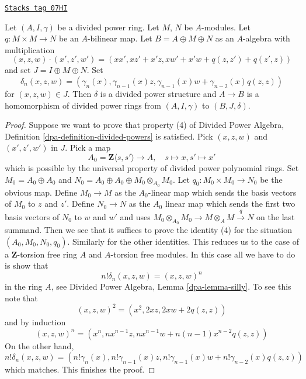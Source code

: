 \begin{lemma}
\label{crystalline-lemma-divided-power-second-order-thickening}
\href{https://stacks.math.columbia.edu/tag/07HI}{\texttt{Stacks tag 07HI}}

Let $(A, I, \gamma)$ be a divided power ring. Let $M$, $N$ be $A$-modules.
Let $q : M \times M \to N$ be an $A$-bilinear map.
Let $B = A \oplus M \oplus N$ as an $A$-algebra with multiplication
$$
(x, z, w)\cdot (x', z', w') = (xx', xz' + x'z, xw' + x'w + q(z, z') + q(z', z))
$$
and set $J = I \oplus M \oplus N$. Set
$$
\delta_n(x, z, w) = (\gamma_n(x), \gamma_{n - 1}(x)z,
\gamma_{n - 1}(x)w + \gamma_{n - 2}(x)q(z, z))
$$
for $(x, z, w) \in J$.
Then $\delta$ is a divided power structure and
$A \to B$ is a homomorphism of divided power rings from
$(A, I, \gamma)$ to $(B, J, \delta)$.
\end{lemma}

\begin{proof}
Suppose we want to prove that property (4) of
Divided Power Algebra, Definition \ref{dpa-definition-divided-powers}
is satisfied. Pick $(x, z, w)$ and $(x', z', w')$ in $J$.
Pick a map
$$
A_0 = \mathbf{Z}\langle s, s'\rangle \longrightarrow A,\quad
s \longmapsto x,
s' \longmapsto x'
$$
which is possible by the universal property of divided power
polynomial rings. Set $M_0 = A_0 \oplus A_0$ and
$N_0 = A_0 \oplus A_0 \oplus M_0 \otimes_{A_0} M_0$.
Let $q_0 : M_0 \times M_0 \to N_0$ be the obvious map.
Define $M_0 \to M$ as the $A_0$-linear map which sends
the basis vectors of $M_0$ to $z$ and $z'$. Define $N_0 \to N$
as the $A_0$ linear map which sends the first two basis vectors
of $N_0$ to $w$ and $w'$ and uses
$M_0 \otimes_{A_0} M_0 \to M \otimes_A M \xrightarrow{q} N$
on the last summand. Then we see that it suffices to prove the
identity (4) for the situation $(A_0, M_0, N_0, q_0)$.
Similarly for the other identities. This reduces us to the case
of a $\mathbf{Z}$-torsion free ring $A$ and $A$-torsion free modules.
In this case all we have to do is show that
$$
n! \delta_n(x, z, w) = (x, z, w)^n
$$
in the ring $A$, see Divided Power Algebra, Lemma \ref{dpa-lemma-silly}.
To see this note that
$$
(x, z, w)^2 = (x^2, 2xz, 2xw + 2q(z, z))
$$
and by induction
$$
(x, z, w)^n = (x^n, nx^{n - 1}z, nx^{n - 1}w + n(n - 1)x^{n - 2}q(z, z))
$$
On the other hand,
$$
n! \delta_n(x, z, w) = (n!\gamma_n(x), n!\gamma_{n - 1}(x)z,
n!\gamma_{n - 1}(x)w + n!\gamma_{n - 2}(x) q(z, z))
$$
which matches. This finishes the proof.
\end{proof}

